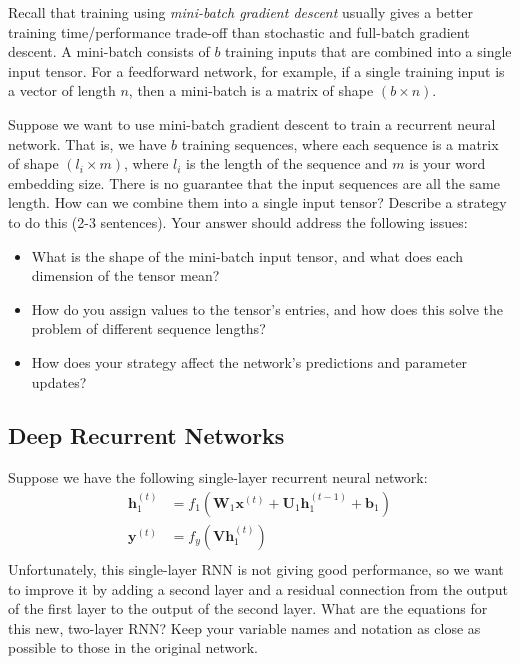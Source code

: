 \documentclass[12pt,a4paper]{article}
\begin{document}
Recall that training using \textit{mini-batch gradient descent} usually gives a better training time/performance trade-off than stochastic and full-batch gradient descent. A mini-batch consists of $b$ training inputs that are combined into a single input tensor. For a feedforward network, for example, if a single training input is a vector of length $n$, then a mini-batch is a matrix of shape $(b \times n)$.

\vspace{.5\baselineskip}

Suppose we want to use mini-batch gradient descent to train a recurrent neural network. That is, we have $b$ training sequences, where each sequence is a matrix of shape $(l_i \times m)$, where $l_i$ is the length of the sequence and $m$ is your word embedding size. There is no guarantee that the input sequences are all the same length. How can we combine them into a single input tensor? Describe a strategy to do this (2-3 sentences). Your answer should address the following issues:

\begin{itemize}
\item What is the shape of the mini-batch input tensor, and what does each dimension of the tensor mean?
\item How do you assign values to the tensor's entries, and how does this solve the problem of different sequence lengths?
\item How does your strategy affect the network's predictions and parameter updates?
\end{itemize}

\subsection{Deep Recurrent Networks}

Suppose we have the following single-layer recurrent neural network:
\begin{align*}
\mathbf{h}^{(t)}_1 &= f_1(\mathbf{W}_1 \mathbf{x}^{(t)} + \mathbf{U}_1 \mathbf{h}^{(t-1)}_1 + \mathbf{b}_1) \\
\mathbf{y}^{(t)} &= f_y(\mathbf{V} \mathbf{h}^{(t)}_1) \\
\end{align*}
Unfortunately, this single-layer RNN is not giving good performance, so we want to improve it by adding a second layer and a residual connection from the output of the first layer to the output of the second layer. What are the equations for this new, two-layer RNN? Keep your variable names and notation as close as possible to those in the original network.
\end{document}
